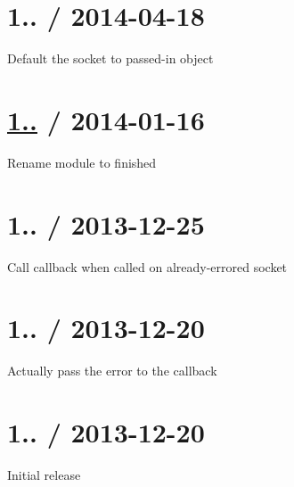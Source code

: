\section*{1.. / 2014-\/04-\/18 }


\begin{DoxyItemize}
\item Default the {\ttfamily socket} to passed-\/in object
\end{DoxyItemize}

\section*{\hyperlink{namespace1_1_11_1_11}{1..} / 2014-\/01-\/16 }


\begin{DoxyItemize}
\item Rename module to {\ttfamily finished}
\end{DoxyItemize}

\section*{1.. / 2013-\/12-\/25 }


\begin{DoxyItemize}
\item Call callback when called on already-\/errored socket
\end{DoxyItemize}

\section*{1.. / 2013-\/12-\/20 }


\begin{DoxyItemize}
\item Actually pass the error to the callback
\end{DoxyItemize}

\section*{1.. / 2013-\/12-\/20 }


\begin{DoxyItemize}
\item Initial release 
\end{DoxyItemize}